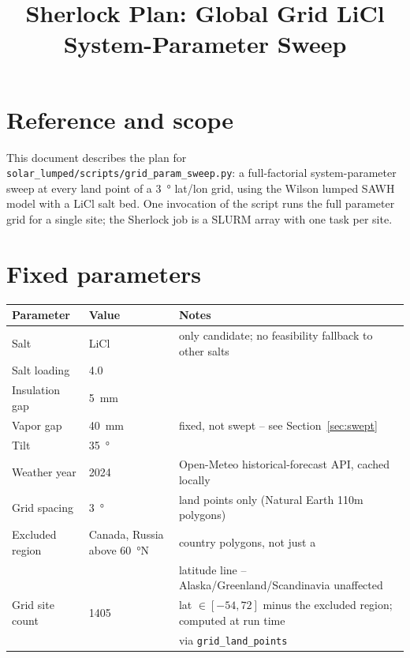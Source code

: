 \documentclass[11pt]{article}
\title{Sherlock Plan: Global Grid LiCl System-Parameter Sweep}
\author{}
\date{}
\begin{document}
\maketitle

\section*{Reference and scope}

This document describes the plan for \texttt{solar\_lumped/scripts/grid\_param\_sweep.py}: a
full-factorial system-parameter sweep at every land point of a \SI{3}{\degree} lat/lon grid,
using the Wilson lumped SAWH model with a LiCl salt bed. One invocation of the script runs the
full parameter grid for a single site; the Sherlock job is a SLURM array with one task per site.

\section{Fixed parameters}\label{sec:fixed-above}

\begin{table}[h]
\centering
\small
\begin{tabular}{@{}lll@{}}
\toprule
\textbf{Parameter} & \textbf{Value} & \textbf{Notes} \\
\midrule
Salt & LiCl & only candidate; no feasibility fallback to other salts \\
Salt loading & 4.0 & \\
Insulation gap & \SI{5}{\milli\meter} & \\
Vapor gap & \SI{40}{\milli\meter} & fixed, not swept -- see Section~\ref{sec:swept} \\
Tilt & \SI{35}{\degree} & \\
Weather year & 2024 & Open-Meteo historical-forecast API, cached locally \\
Grid spacing & \SI{3}{\degree} & land points only (Natural Earth 110m polygons) \\
Excluded region & Canada, Russia above \SI{60}{\degree}N & country polygons, not just a \\
 & & latitude line -- Alaska/Greenland/Scandinavia unaffected \\
Grid site count & 1405 & lat $\in[-54,72]$ minus the excluded region; computed at run time \\
 & & via \texttt{grid\_land\_points} \\
\bottomrule
\end{tabular}
\end{table}
\end{document}
